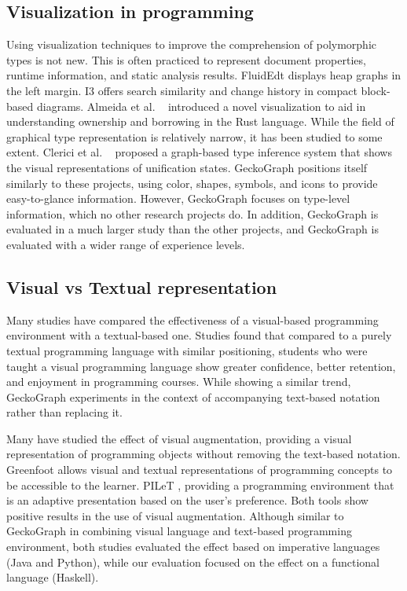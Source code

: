 \subsection{Visualization in programming}
Using visualization techniques to improve the comprehension of polymorphic types is not new. This is often practiced to represent document properties, runtime information, and static analysis results.  FluidEdt \cite{Ou2015-vr} displays heap graphs in the left margin. I3 \cite{Beck2015-my} offers search similarity and change history in compact block-based diagrams. Almeida et al. ~\cite{Almeida2022-bv} introduced a novel visualization to aid in understanding ownership and borrowing in the Rust language. While the field of graphical type representation is relatively narrow, it has been studied to some extent. Clerici et al. ~\cite{Clerici2013-ru} proposed a graph-based type inference system that shows the visual representations of unification states. GeckoGraph positions itself similarly to these projects, using color, shapes, symbols, and icons to provide easy-to-glance information. However, GeckoGraph focuses on type-level information, which no other research projects do. In addition, GeckoGraph is evaluated in a much larger study than the other projects, and GeckoGraph is evaluated with a wider range of experience levels. 

\subsection{Visual vs Textual representation}

Many studies have compared the effectiveness of a visual-based programming environment with a textual-based one. Studies \cite{Noone2018-wl, Da_Silva_Ribeiro2014-tm, Cliburn2008-jo, Daly2011-is} found that compared to a purely textual programming language with similar positioning, students who were taught a visual programming language show greater confidence, better retention, and enjoyment in programming courses. While showing a similar trend, GeckoGraph experiments in the context of accompanying text-based notation rather than replacing it. 


Many have studied the effect of visual augmentation, providing a visual representation of programming objects without removing the text-based notation. Greenfoot \cite{Montero2010-uh} allows visual and textual representations of programming concepts to be accessible to the learner. PILeT \cite{Alshaigy2015-wy}, providing a programming environment that is an adaptive presentation based on the user's preference. Both tools show positive results in the use of visual augmentation. Although similar to GeckoGraph in combining visual language and text-based programming environment, both studies evaluated the effect based on imperative languages (Java and Python), while our evaluation focused on the effect on a functional language (Haskell).


